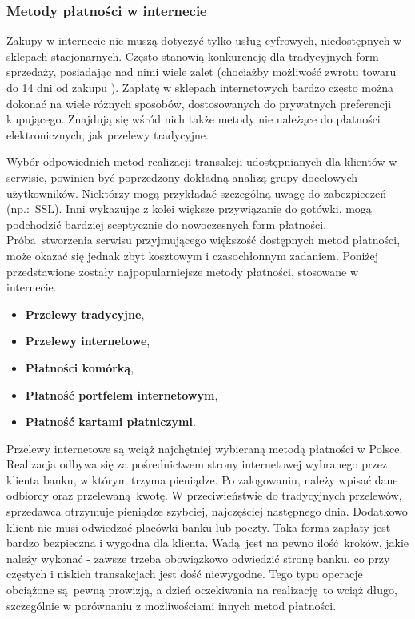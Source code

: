 \subsubsection*{Metody płatności w internecie}
Zakupy w internecie nie muszą dotyczyć tylko usług cyfrowych, niedostępnych w  sklepach stacjonarnych. Często stanowią konkurencję dla tradycyjnych form sprzedaży, posiadając nad nimi wiele zalet (chociażby możliwość zwrotu towaru do 14 dni od zakupu \cite{wszystko_o_platnosciach}). Zapłatę w sklepach internetowych bardzo często można dokonać na wiele różnych sposobów, dostosowanych do prywatnych preferencji kupującego. Znajdują się wśród nich także metody nie należące do płatności elektronicznych, jak przelewy tradycyjne.

Wybór odpowiednich metod realizacji transakcji udostępnianych dla klientów w serwisie, powinien być poprzedzony dokładną analizą grupy docelowych użytkowników. Niektórzy mogą przykładać szczególną uwagę do zabezpieczeń (np.:~SSL). Inni wykazując z kolei większe przywiązanie do gotówki, mogą podchodzić bardziej sceptycznie do nowoczesnych form płatności. Próba stworzenia serwisu przyjmującego większość dostępnych metod płatności, może okazać się jednak zbyt kosztowym i czasochłonnym zadaniem. Poniżej przedstawione zostały najpopularniejsze metody płatności, stosowane w internecie.
\begin{itemize}
	\item \textbf{Przelewy tradycyjne},
	\item \textbf{Przelewy internetowe},
	\item \textbf{Płatności komórką},
	\item \textbf{Płatność portfelem internetowym},
	\item \textbf{Płatność kartami płatniczymi}.
\end{itemize}
Przelewy internetowe są wciąż najchętniej wybieraną metodą płatności w Polsce. Realizacja odbywa się za pośrednictwem strony internetowej wybranego przez klienta banku, w którym trzyma pieniądze. Po zalogowaniu, należy wpisać dane odbiorcy oraz przelewaną kwotę. W przeciwieństwie do tradycyjnych przelewów, sprzedawca otrzymuje pieniądze szybciej, najczęściej następnego dnia. Dodatkowo klient nie musi odwiedzać placówki banku lub poczty. Taka forma zapłaty jest bardzo bezpieczna i wygodna dla klienta. Wadą jest na pewno ilość kroków, jakie należy wykonać - zawsze trzeba obowiązkowo odwiedzić stronę banku, co przy częstych i niskich transakcjach jest dość niewygodne. Tego typu operacje obciążone są pewną prowizją, a dzień oczekiwania na realizację to wciąż długo, szczególnie w porównaniu z możliwościami innych metod płatności.

